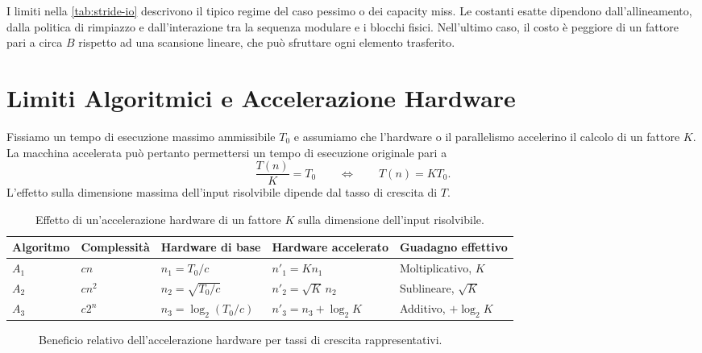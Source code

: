 I limiti nella \autoref{tab:stride-io} descrivono il tipico regime del caso pessimo o dei capacity miss. Le costanti esatte dipendono dall'allineamento, dalla politica di rimpiazzo e dall'interazione tra la sequenza modulare e i blocchi fisici. Nell'ultimo caso, il costo è peggiore di un fattore pari a circa $B$ rispetto ad una scansione lineare, che può sfruttare ogni elemento trasferito.

\section{Limiti Algoritmici e Accelerazione Hardware}
\label{sec:scaling-laws}

Fissiamo un tempo di esecuzione massimo ammissibile $T_0$ e assumiamo che l'hardware o il parallelismo accelerino il calcolo di un fattore $K$. La macchina accelerata può pertanto permettersi un tempo di esecuzione originale pari a
\[
  \frac{T(n)}{K}=T_0
  \qquad\Longleftrightarrow\qquad
  T(n)=K T_0.
\]
L'effetto sulla dimensione massima dell'input risolvibile dipende dal tasso di crescita di $T$.

\begin{table}[H]
  \centering
  \small
  \caption{Effetto di un'accelerazione hardware di un fattore $K$ sulla dimensione dell'input risolvibile.}
  \label{tab:scaling-laws}
  \begin{tabularx}{\textwidth}{@{}p{}p{}YY>{\raggedright\arraybackslash}p{0.18\textwidth}@{}}
    \toprule
    Algoritmo & Complessità & Hardware di base & Hardware accelerato & Guadagno effettivo \\
    \midrule
    $A_1$ & $c n$ & $n_1=T_0/c$ & $n'_1=K n_1$ & Moltiplicativo, $K$ \\
    $A_2$ & $c n^2$ & $n_2=\sqrt{T_0/c}$ & $n'_2=\sqrt{K}\,n_2$ & Sublineare, $\sqrt K$ \\
    $A_3$ & $c2^n$ & $n_3=\log_2(T_0/c)$ & $n'_3=n_3+\log_2 K$ & Additivo, $+\log_2 K$ \\
    \bottomrule
  \end{tabularx}
\end{table}

\begin{figure}[H]
  \centering
  \caption{Beneficio relativo dell'accelerazione hardware per tassi di crescita rappresentativi.}
  \label{fig:scaling-laws}
\end{figure}

